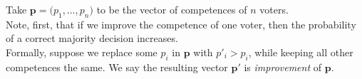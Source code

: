 \documentclass[preview, border={0pt 5pt 3pt 1pt}, varwidth=14cm]{standalone} %
\begin{document}




    






    Take \(\bm{p} = \big(p_1, \dots, p_n\big)\) to be the vector of competences of \(n\) voters.\\

    Note, first, that if we improve the competence of one voter, 
    then the probability of a correct majority decision increases.\\

    Formally, suppose we replace some \(p_i\) in \(\bm{p}\) with \(p'_i > p_i\), 
    while keeping all other competences the same.
    We say the resulting vector \(\bm{p}'\) is \emph{improvement} of \(\bm{p}\).\\
    
\end{document}
